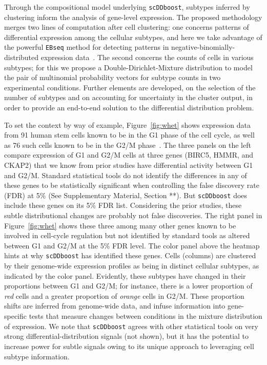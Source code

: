 \documentclass[aoas,preprint]{imsart}
\begin{document}
Through the compositional model underlying \verb+scDDboost+, subtypes inferred by clustering 
inform the analysis of gene-level expression.  The proposed methodology merges two lines of computation
after cell clustering: one concerns patterns of differential expression among 
the cellular subtypes, and here we take advantage of the powerful \verb+EBseq+ method for detecting
patterns in negative-binomially-distributed expression data~\citep{ref:Leng}.  The second concerns 
the counts of cells in various subtypes; for this we propose a Double-Dirichlet-Mixture distribution
to model the pair of multinomial probability vectors for subtype counts in two experimental conditions.
Further elements are developed, on the selection of the number of subtypes and on accounting for uncertainty in the cluster output,  in order to provide an end-to-end solution to the differential distribution
problem.  

To set the context by way of example, 
Figure~\ref{fig:whet} shows expression data from 91 human 
stem cells known to be in the G1 phase of the cell cycle, as well as
76 such cells known to be in the G2/M phase~\citep{ref:Leng}.  The three panels on the left compare expression of G1
and G2/M cells at three genes (BIRC5, HMMR, and CKAP2)  that we know from prior studies  have differential activity between G1 and G2/M.  Standard statistical tools do not identify the differences in any of these genes
to be statistically significant when controlling the false discovery rate (FDR) at 5\% (See Supplementary Material, 
Section **).  But \verb+scDDboost+ does include these genes on its 5\% FDR list.
Considering the prior studies, these subtle distributional changes are probably not false discoveries.
The right panel in Figure~\ref{fig:whet} shows these three among
  many other genes known to be involved in cell-cycle regulation but
not identified by standard tools as altered between G1 and G2/M at the 5\% FDR level.    The color panel above the
heatmap hints at why \verb+scDDboost+ has identified these genes. Cells (columns) are clustered by their genome-wide
expression profiles as being in distinct cellular subtypes, as indicated by the color panel.   Evidently, these 
subtypes have changed in their proportions between G1 and G2/M; for instance, there is a lower proportion
 of {\em red} cells   and a greater proportion of {\em orange} cells in G2/M. These proportion shifts
are inferred from genome-wide data, and infuse information into gene-specific tests that measure 
changes between conditions in the mixture distribution of expression.  We note that \verb+scDDboost+ 
agrees with other statistical tools on very strong differential-distribution signals (not shown), but it 
has the potential to increase power for subtle signals owing to its unique approach to leveraging cell subtype
information.
\end{document}
